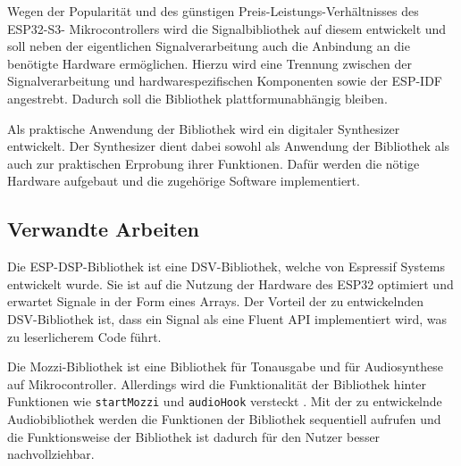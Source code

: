 Wegen der Popularität und des günstigen Preis-Leistungs-Verhältnisses des ESP32-S3-
Mikrocontrollers wird die Signalbibliothek auf diesem entwickelt und
soll neben der eigentlichen 
Signalverarbeitung auch die Anbindung an die benötigte Hardware ermöglichen. Hierzu 
wird eine Trennung zwischen der Signalverarbeitung und hardwarespezifischen Komponenten 
sowie der ESP-IDF
angestrebt. Dadurch soll die Bibliothek plattformunabhängig bleiben. 

Als praktische Anwendung der Bibliothek wird ein digitaler Synthesizer entwickelt.
Der Synthesizer dient dabei sowohl als Anwendung der 
Bibliothek als auch zur praktischen Erprobung ihrer Funktionen.
Dafür werden die nötige Hardware aufgebaut und die zugehörige Software implementiert.





\subsection{Verwandte Arbeiten}

Die ESP-DSP-Bibliothek \cite{ESPDSV} ist eine DSV-Bibliothek, welche von 
Espressif Systems entwickelt wurde. Sie ist auf die Nutzung der Hardware des ESP32 
optimiert und erwartet Signale in der Form eines Arrays. Der Vorteil der 
zu entwickelnden DSV-Bibliothek ist, dass ein Signal als eine Fluent API
implementiert wird, was zu leserlicherem Code führt.

Die Mozzi-Bibliothek \cite{Mozzi} ist eine Bibliothek für Tonausgabe und für 
Audiosynthese auf Mikrocontroller. Allerdings wird die Funktionalität der Bibliothek hinter 
Funktionen wie \lstinline|startMozzi| und \lstinline|audioHook| versteckt
\cite{MozziSimpleSketch}. Mit der zu entwickelnde Audiobibliothek werden 
die Funktionen der Bibliothek sequentiell aufrufen und die Funktionsweise
der Bibliothek ist dadurch für den Nutzer besser nachvollziehbar. 